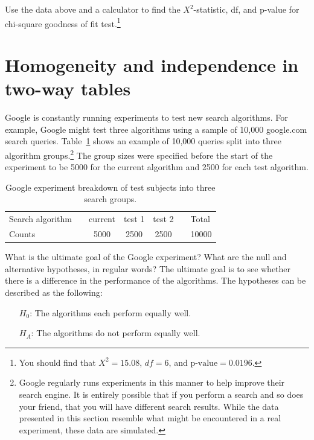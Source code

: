 \begin{exercise}
Use the data above and a calculator to find the $X^2$-statistic, df, and p-value for chi-square goodness of fit test.\footnote{You should find that $X^2=15.08$, $df=6$, and $\text{p-value}=0.0196$.}
\end{exercise}



\section[Homogeneity and independence in two-way tables]{Homogeneity and independence in two-way tables   }
\label{twoWayTablesAndChiSquare}


Google is constantly running experiments to test new search algorithms. For example, Google might test three algorithms using a sample of 10,000 google.com search queries. Table~\ref{googleSearchAlgorithmByAlgorithmOnly} shows an example of 10,000 queries split into three algorithm groups.\footnote{Google regularly runs experiments in this manner to help improve their search engine. It is entirely possible that if you perform a search and so does your friend, that you will have different search results. While the data presented in this section resemble what might be encountered in a real experiment, these data are simulated.} The group sizes were specified before the start of the experiment to be 5000 for the current algorithm and 2500 for each test algorithm.

\begin{table}[h]
\centering
\begin{tabular}{ll ccc ll}
\hline
Search algorithm	 & \hspace{1mm} & current & test 1 & test 2 & \hspace{1mm} & Total \\
Counts &		& 5000 & 2500 & 2500 & & 10000 \\
\hline
\end{tabular}
\caption{Google experiment breakdown of test subjects into three search groups.}
\label{googleSearchAlgorithmByAlgorithmOnly}
\end{table}


\begin{example}{What is the ultimate goal of the Google experiment? What are the null and alternative hypotheses, in regular words?}
The ultimate goal is to see whether there is a difference in the performance of the algorithms. The hypotheses can be described as the following:
\begin{itemize}
\item[$H_0$:] The algorithms each perform equally well.
\item[$H_A$:] The algorithms do not perform equally well.
\end{itemize}
\end{example}

